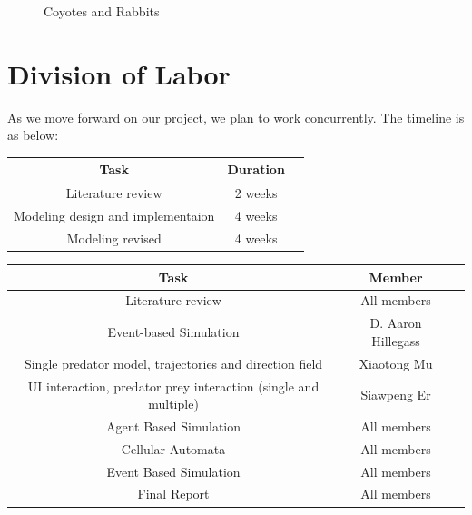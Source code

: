 \documentclass{article}
\begin{document}
\begin{normalsize}
\begin{figure}[H]
	\caption{Coyotes and Rabbits}
\end{figure}





		\section{Division of Labor}
		As we move forward on our project, we plan to work concurrently. The timeline is as below:
		
		\begin{center}
			\begin{tabular}{ |c|c|c| } 
				\hline
				Task & Duration  \\ 
				\hline
				Literature review & 2 weeks \\ 
				Modeling design and implementaion & 4 weeks \\ 
				Modeling revised & 4 weeks \\ 
				\hline
			\end{tabular}
		\end{center}
	
		\begin{center}
			\begin{tabular}{ |c|c|c| } 
				\hline
				Task & Member  \\ 
				\hline
				Literature review & All members\\			
				Event-based Simulation & D. Aaron Hillegass\\ 
				Single predator model, trajectories and direction field & Xiaotong Mu\\
				UI interaction, predator prey interaction (single and multiple) & Siawpeng Er\\
				Agent Based Simulation & All members\\
				Cellular Automata & All members\\
				Event Based Simulation & All members\\
				Final Report & All members \\
				\hline
			\end{tabular}
		\end{center}

		
		
		
	\end{normalsize}
	
\end{document}
